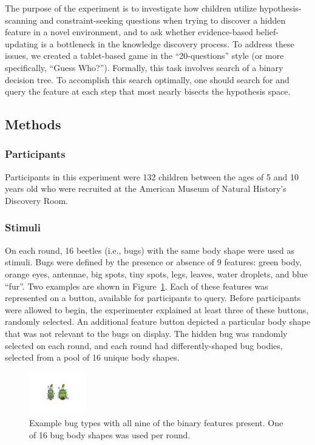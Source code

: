 \documentclass[10pt,letterpaper]{article}
\begin{document}
The purpose of the experiment is to investigate how children utilize hypothesis-scanning and constraint-seeking questions when trying to discover a hidden feature in a novel environment, and to ask whether evidence-based belief-updating is a bottleneck in the knowledge discovery process. To address these issues, we created a tablet-based game in the ``20-questions'' style (or more specifically, ``Guess Who?''). Formally, this task involves search of a binary decision tree. To accomplish this search optimally, one should search for and query the feature at each step that most nearly bisects the hypothesis space.

\subsection{Methods}

\subsubsection{Participants}

Participants in this experiment were 132 children between the ages of 5 and 10 years old who were recruited at the American Museum of Natural History's Discovery Room.

\subsubsection{Stimuli}

On each round, 16 beetles (i.e., bugs) with the same body shape were used as stimuli. Bugs were defined by the presence or absence of 9 features: green body, orange eyes, antennae, big spots, tiny spots, legs, leaves, water droplets, and blue ``fur''. Two examples are shown in Figure~\ref{fig:example_bugs}. Each of these features was represented on a button, available for participants to query. Before participants were allowed to begin, the experimenter explained at least three of these buttons, randomly selected. An additional feature button depicted a particular body shape that was not relevant to the bugs on display. The hidden bug was randomly selected on each round, and each round had differently-shaped bug bodies, selected from a pool of 16 unique body shapes.

\begin{figure}[h]
  \centering
  \includegraphics[width=0.22\textwidth]{figures/example_bugs}
  \caption{Example bug types with all nine of the binary features present. One of 16 bug body shapes was used per round.}
  \label{fig:example_bugs}
\end{figure} 
\end{document}
